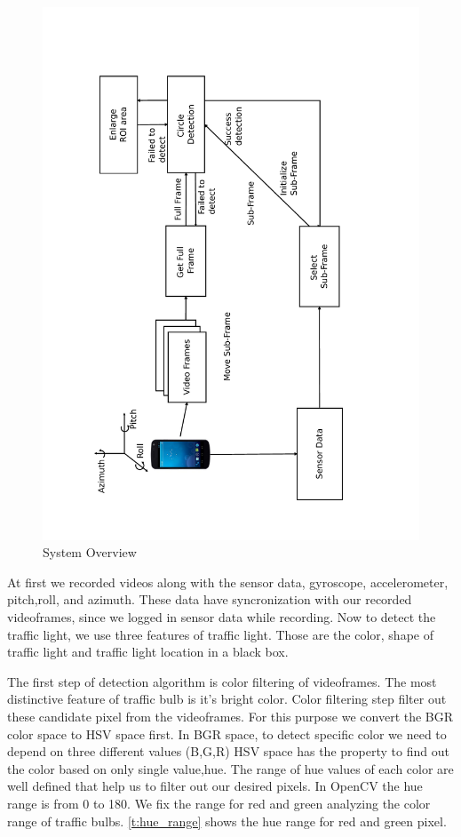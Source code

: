\begin{figure}
\centering
\includegraphics[width=5.2in]{figures/sysdia.pdf}
\caption{System Overview}
\label{f:sys_dia}
\end{figure}

At first we recorded videos along with the sensor data, gyroscope, accelerometer, pitch,roll, and azimuth.
These data have syncronization with our recorded videoframes, since we logged in sensor data while recording.
Now to detect the traffic light, we use three features of traffic light.
Those are the color, shape of traffic light and traffic light location in a black box.

The first step of detection algorithm is color filtering of videoframes.
The most distinctive feature of traffic bulb is it's bright color.
Color filtering step filter out these candidate pixel from the videoframes.
For this purpose we convert the BGR color space to HSV space first.
In BGR space, to detect specific color we need to depend on three different values (B,G,R)
HSV space has the property to find out the color based on only single value,hue.
The range of hue values of each color are well defined that help us to filter out our desired pixels.
In OpenCV the hue range is from 0 to 180.
We fix the range for red and green analyzing the color range of traffic bulbs.
\ref{t:hue_range} shows the hue range for red and green pixel.

